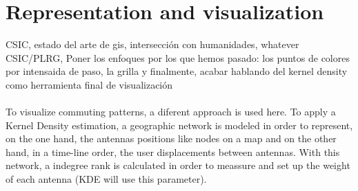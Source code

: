 \newpage

\section{Representation and visualization}

 {\color{red} CSIC, estado del arte de gis, intersección con humanidades, whatever}
\\
 {\color{red} CSIC/PLRG, Poner los enfoques por los que hemos pasado: los puntos de colores por intensaida de paso, la grilla y finalmente, acabar hablando del kernel density como herramienta final de visualización} 
 \\
 \\
To visualize commuting patterns, a diferent approach is used here. To apply a Kernel Density estimation, a geographic network is modeled in order to represent, on the one hand, the antennas positions like nodes on a map and on the other hand, in a time-line order, the user displacements between antennas. With this network, a indegree rank is calculated in order to meassure and set up the weight of each antenna (KDE will use this parameter).

